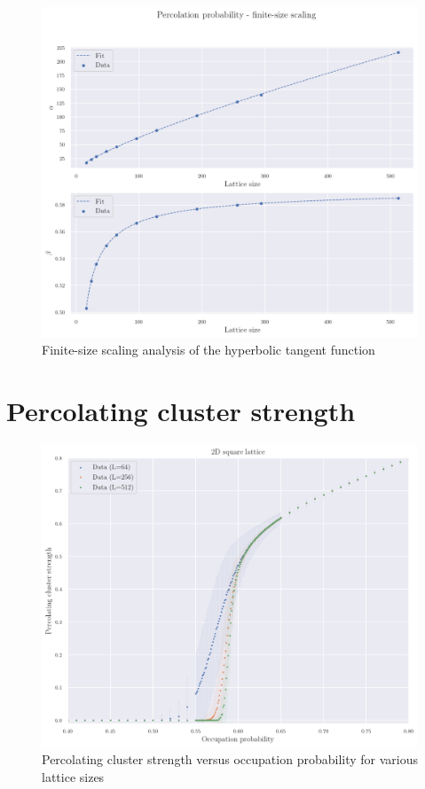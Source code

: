 \begin{figure}[H]
  \includegraphics[width=\linewidth]{Images/sec3_perc_prob_3.png}
  \caption{Finite-size scaling analysis of the hyperbolic tangent function}
  \label{fig:sec3_perc_prob_3}
\end{figure}



\section{Percolating cluster strength}


\begin{figure}[H]
  \includegraphics[width=\linewidth]{Images/sec3_perc_clust_strength_1.png}
  \caption{Percolating cluster strength versus occupation probability for various lattice sizes}
  \label{fig:sec3_perc_clust_strength_1}
\end{figure}


